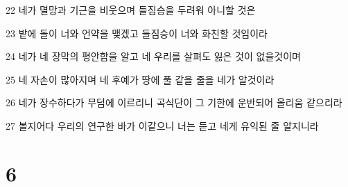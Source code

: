\par 22 네가 멸망과 기근을 비웃으며 들짐승을 두려워 아니할 것은
\par 23 밭에 돌이 너와 언약을 맺겠고 들짐승이 너와 화친할 것임이라
\par 24 네가 네 장막의 평안함을 알고 네 우리를 살펴도 잃은 것이 없을것이며
\par 25 네 자손이 많아지며 네 후예가 땅에 풀 같을 줄을 네가 알것이라
\par 26 네가 장수하다가 무덤에 이르리니 곡식단이 그 기한에 운반되어 올리움 같으리라
\par 27 볼지어다 우리의 연구한 바가 이같으니 너는 듣고 네게 유익된 줄 알지니라

\chapter{6}

